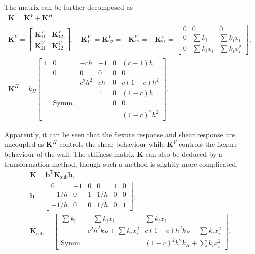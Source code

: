 \documentclass[11pt]{article}
\newcommand*{\mT}{\mathrm{T}}
\begin{document}
The matrix can be further decomposed as
\begin{gather*}
\mathbf{K}=\mathbf{K}^V+\mathbf{K}^H,\\
\mathbf{K}^V=\begin{bmatrix}
	\mathbf{K}^V_{11} & \mathbf{K}^V_{12} \\[2mm]
	\mathbf{K}^V_{21} & \mathbf{K}^V_{22}
\end{bmatrix},\quad
\mathbf{K}^V_{11}=\mathbf{K}^V_{22}=-\mathbf{K}^V_{12}=-\mathbf{K}^V_{21}=\begin{bmatrix}
	0 &      0       &       0        \\[2mm]
	0 &  \sum{}k_i   &  \sum{}k_ix_i  \\[2mm]
	0 & \sum{}k_ix_i & \sum{}k_ix_i^2
\end{bmatrix},\\
\mathbf{K}^H=k_H\begin{bmatrix}
	1 &      0       &  -ch   & -1 & 0 &   (c-1)h   \\
	  &      0       &   0    & 0  & 0 &     0      \\
	  &              & c^2h^2 & ch & 0 & c(1-c)h^2  \\
	  &              &        & 1  & 0 &   (1-c)h   \\
	  & \text{Symm.} &        &    & 0 &     0      \\
	  &              &        &    &   & (1-c)^2h^2
\end{bmatrix}.
\end{gather*}

Apparently, it can be seen that the flexure response and shear response are uncoupled as $\mathbf{K}^H$ controls the shear behaviour while $\mathbf{K}^V$ controls the flexure behaviour of the wall. The stiffness matrix $\mathbf{K}$ can also be deduced by a transformation method, though such a method is slightly more complicated.
\begin{gather*}
\mathbf{K}=\mathbf{b}^\mT\mathbf{K}_\text{sub}\mathbf{b},\\
\mathbf{b}=\begin{bmatrix}
	 0   & -1 & 0 &  0  & 1 & 0 \\
	-1/h & 0  & 1 & 1/h & 0 & 0 \\
	-1/h & 0  & 0 & 1/h & 0 & 1
\end{bmatrix},\\
\mathbf{K}_\text{sub}=
\begin{bmatrix}
	 \sum{}k_i   &      -\sum{}k_ix_i       &         \sum{}k_ix_i         \\[2mm]
	             & c^2h^2k_H+\sum{}k_ix_i^2 & c(1-c)h^2k_H-\sum{}k_ix_i^2  \\[2mm]
	\text{Symm.} &                          & (1-c)^2h^2k_H+\sum{}k_ix_i^2
\end{bmatrix}.
\end{gather*}
\end{document}
